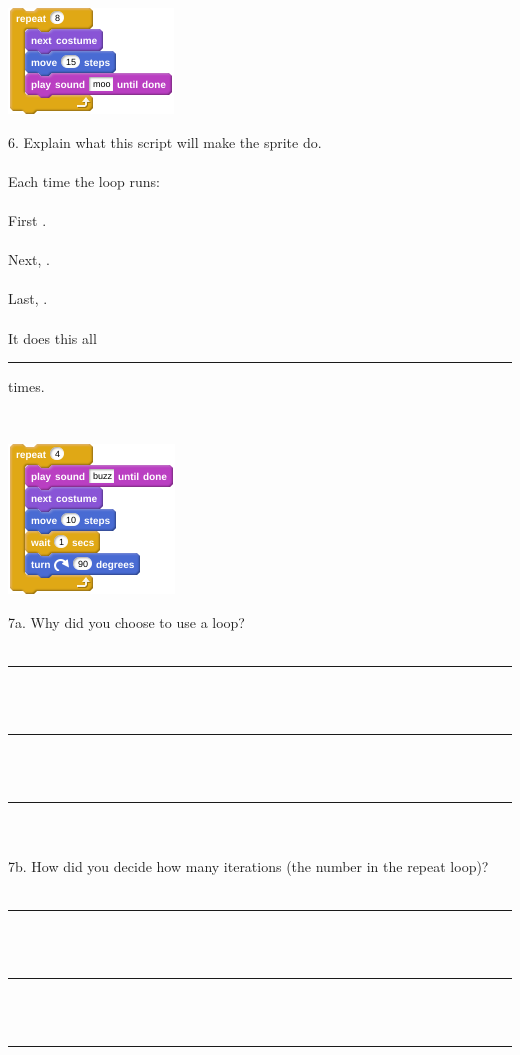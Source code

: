\documentclass[letterpaper,12pt]{article}
\begin{document}
\newpage


\begin{center}
\includegraphics[scale=1]{q6_script0.png}
\end{center}
6. Explain what this script will make the sprite do. \\ \\
Each time the loop runs: \\ \\
\indent First \hrulefill. \\ \\
\indent Next, \hrulefill. \\ \\
\indent Last, \hrulefill. \\ \\
It does this all \rule{1cm}{0.5pt} times.

\noindent \dotfill \\

\begin{center}
\includegraphics[scale=1]{q7_script0.png}
\end{center}
\noindent 7a. Why did you choose to use a loop? \\ \\
\noindent \rule{18.5cm}{0.5pt} \\ \\
\noindent \rule{18.5cm}{0.5pt} \\ \\
\noindent \rule{18.5cm}{0.5pt} \\ \\
\noindent 7b. How did you decide how many iterations (the number in the repeat loop)? \\ \\
\noindent \rule{18.5cm}{0.5pt} \\ \\
\noindent \rule{18.5cm}{0.5pt} \\ \\
\noindent \rule{18.5cm}{0.5pt} \\
\end{document}
